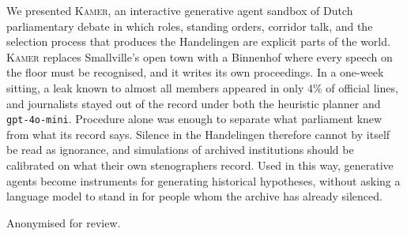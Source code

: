 \documentclass[sigconf,review,anonymous]{acmart}
\newcommand{\sys}{\textsc{Kamer}}
\begin{document}
We presented \sys{}, an interactive generative agent sandbox of Dutch
parliamentary debate in which roles, standing orders, corridor talk, and
the selection process that produces the Handelingen are explicit parts of
the world. \sys{} replaces Smallville's open town with a Binnenhof where
every speech on the floor must be recognised, and it writes its own
proceedings. In a one-week sitting, a leak known to almost all members
appeared in only $4\%$ of official lines, and journalists stayed out of
the record under both the heuristic planner and \texttt{gpt-4o-mini}.
Procedure alone was enough to separate what parliament knew from what its
record says. Silence in the Handelingen therefore cannot by itself be read
as ignorance, and simulations of archived institutions should be
calibrated on what their own stenographers record. Used in this way,
generative agents become instruments for generating historical hypotheses,
without asking a language model to stand in for people whom the archive
has already silenced.

\begin{acks}
Anonymised for review.
\end{acks}



\end{document}
